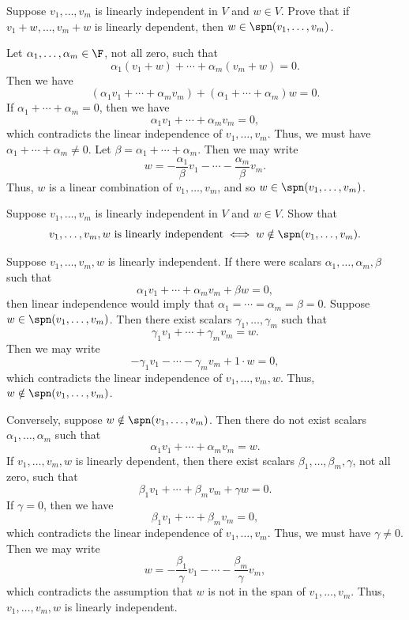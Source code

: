\begin{exercise}
Suppose $v_1,\dots,v_m$ is linearly independent in $V$ and $w\in V$. Prove that
if $v_1+w,\dots,v_m+w$ is linearly dependent, then $w\in\spn(v_1,\dots,v_m)$.
\end{exercise}
\begin{solution}
Let $\alpha_1,\dots,\alpha_m\in\F$, not all zero, such that
\[ \alpha_1(v_1+w)+\cdots+\alpha_m(v_m+w)=0. \]
Then we have
\[ (\alpha_1v_1+\cdots+\alpha_mv_m)+(\alpha_1+\cdots+\alpha_m)w=0. \]
If $\alpha_1+\cdots+\alpha_m=0$, then we have
\[ \alpha_1v_1+\cdots+\alpha_mv_m=0, \]
which contradicts the linear independence of $v_1,\dots,v_m$. Thus, we must
have $\alpha_1+\cdots+\alpha_m\ne0$. Let $\beta=\alpha_1+\cdots+\alpha_m$.
Then we may write
\[ w = -\frac{\alpha_1}{\beta}v_1-\cdots-\frac{\alpha_m}{\beta}v_m. \]
Thus, $w$ is a linear combination of $v_1,\dots,v_m$, and so
$w\in\spn(v_1,\dots,v_m)$.
\end{solution}

\begin{exercise}
Suppose $v_1,\dots,v_m$ is linearly independent in $V$ and $w\in V$. Show that
\[ v_1,\dots,v_m,w \text{ is linearly independent} \iff
   w\notin\spn(v_1,\dots,v_m). \]
\end{exercise}
\begin{solution}
Suppose $v_1,\dots,v_m,w$ is linearly independent. If there were scalars
$\alpha_1,\dots,\alpha_m,\beta$ such that
\[ \alpha_1v_1+\cdots+\alpha_mv_m+\beta w=0, \]
then linear independence would imply that $\alpha_1=\cdots=\alpha_m=\beta=0$.
Suppose $w\in\spn(v_1,\dots,v_m)$. Then there exist scalars
$\gamma_1,\dots,\gamma_m$ such that
\[ \gamma_1v_1+\cdots+\gamma_mv_m=w. \]
Then we may write
\[ -\gamma_1v_1-\cdots-\gamma_mv_m+1\cdot w=0, \]
which contradicts the linear independence of $v_1,\dots,v_m,w$. Thus,
$w\notin\spn(v_1,\allowbreak\dots,\allowbreak v_m)$.

Conversely, suppose $w\notin\spn(v_1,\dots,v_m)$. Then there do not exist
scalars $\alpha_1,\dots,\alpha_m$ such that
\[ \alpha_1v_1+\cdots+\alpha_mv_m=w. \]
If $v_1,\dots,v_m,w$ is linearly dependent, then there exist scalars
$\beta_1,\dots,\beta_m,\gamma$, not all zero, such that
\[ \beta_1v_1+\cdots+\beta_mv_m+\gamma w=0. \]
If $\gamma=0$, then we have
\[ \beta_1v_1+\cdots+\beta_mv_m=0, \]
which contradicts the linear independence of $v_1,\dots,v_m$. Thus, we must
have $\gamma\ne0$. Then we may write
\[ w = -\frac{\beta_1}{\gamma}v_1-\cdots-\frac{\beta_m}{\gamma}v_m, \]
which contradicts the assumption that $w$ is not in the span of
$v_1,\dots,v_m$. Thus, $v_1,\dots,v_m,w$ is linearly independent.
\end{solution}

